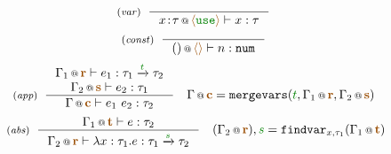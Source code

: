 \begin{figure}[t]
\begin{equation*}
\tyrule{var}
  { }
  {\coctx{x\!:\!\tau}{\alift{\cunit}} \vdash x : \tau }
\end{equation*}
\begin{equation*}
\tyrule{const}
  { }
  {\coctx{()}{\alift{}} \vdash n : \ident{num} }
\end{equation*}
\begin{equation*}
\tyrule{app}
  {\coctx{\Gamma_1}{\aclrd{\textbf{r}}} \vdash e_1 : \tau_1 \xrightarrow{\cclrd{t}} \tau_2 \\
   \coctx{\Gamma_2}{\aclrd{\textbf{s}}} \vdash e_2 : \tau_1 }
  {\coctx{\Gamma}{\aclrd{\textbf{c}}} \vdash e_1~e_2 : \tau_2}
\quad \coctx{\Gamma}{\aclrd{\textbf{c}}} = \ident{mergevars}(\cclrd{t}, \coctx{\Gamma_1}{\aclrd{\textbf{r}}}, \coctx{\Gamma_2}{\aclrd{\textbf{s}}})
\end{equation*}
\begin{equation*}
\tyrule{abs}
  {\coctx{\Gamma_1}{\aclrd{\textbf{t}}} \vdash e : \tau_2}
  {\coctx{\Gamma_2}{\aclrd{\textbf{r}}} \vdash \lambda x:\tau_1.e : \tau_1 \xrightarrow{\cclrd{s}} \tau_2 }
\quad (\coctx{\Gamma_2}{\aclrd{\textbf{r}}}), \cclrd{s} = \ident{findvar}_{x,\tau_1}(\coctx{\Gamma_1}{\aclrd{\textbf{t}}})
\end{equation*}


\end{figure}
